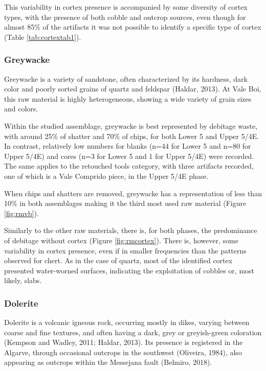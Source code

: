 \documentclass[12pt,twoside]{reedthesis}
\begin{document}
This variability in cortex presence is accompanied by some diversity of cortex types, with the presence of both cobble and outcrop sources, even though for almost 85\% of the artifacts it was not possible to identify a specific type of cortex (Table \ref{tab:cortextab1}).

\hypertarget{greywacke}{%
\subsubsection{Greywacke}\label{greywacke}}

Greywacke is a variety of sandstone, often characterized by its hardness, dark color and poorly sorted grains of quartz and feldspar (Haldar, 2013). At Vale Boi, this raw material is highly heterogeneous, showing a wide variety of grain sizes and colors.

Within the studied assemblage, greywacke is best represented by debitage waste, with around 25\% of shatter and 70\% of chips, for both Lower 5 and Upper 5/4E. In contrast, relatively low numbers for blanks (n=44 for Lower 5 and n=80 for Upper 5/4E) and cores (n=3 for Lower 5 and 1 for Upper 5/4E) were recorded. The same applies to the retouched tools category, with three artifacts recorded, one of which is a Vale Comprido piece, in the Upper 5/4E phase.

When chips and shatters are removed, greywacke has a representation of less than 10\% in both assemblages making it the third most used raw material (Figure \ref{fig:rmvb}).

Similarly to the other raw materials, there is, for both phases, the predominance of debitage without cortex (Figure \ref{fig:rmcortex}). There is, however, some variability in cortex presence, even if in smaller frequencies than the patterns observed for chert. As in the case of quartz, most of the identified cortex presented water-worned surfaces, indicating the exploitation of cobbles or, most likely, slabs.

\hypertarget{dolerite}{%
\subsubsection{Dolerite}\label{dolerite}}

Dolerite is a volcanic igneous rock, occurring mostly in dikes, varying between coarse and fine textures, and often having a dark, grey or greyish-green coloration (Kempson and Wadley, 2011; Haldar, 2013). Its presence is registered in the Algarve, through occasional outcrops in the southwest (Oliveira, 1984), also appearing as outcrops within the Messejana fault (Belmiro, 2018).
\end{document}
